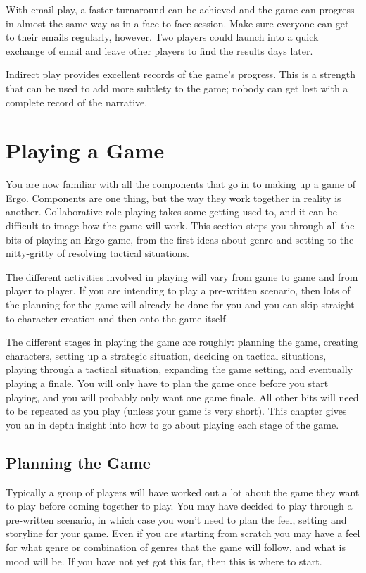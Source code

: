 \documentclass[twoside]{book}
\begin{document}
With email play, a faster turnaround can be achieved and the game can
progress in almost the same way as in a face-to-face session. Make
sure everyone can get to their emails regularly, however. Two players
could launch into a quick exchange of email and leave other players to
find the results days later.

Indirect play provides excellent records of the game's progress. This
is a strength that can be used to add more subtlety to the game;
nobody can get lost with a complete record of the narrative.

\chapter{Playing a Game}

You are now familiar with all the components that go in to making up a
game of Ergo. Components are one thing, but the way they work together
in reality is another. Collaborative role-playing takes some getting
used to, and it can be difficult to image how the game will work. This
section steps you through all the bits of playing an Ergo game, from
the first ideas about genre and setting to the nitty-gritty of
resolving tactical situations.

The different activities involved in playing will vary from game to
game and from player to player. If you are intending to play a
pre-written scenario, then lots of the planning for the game will
already be done for you and you can skip straight to character
creation and then onto the game itself.

The different stages in playing the game are roughly: planning the
game, creating characters, setting up a strategic situation, deciding
on tactical situations, playing through a tactical situation,
expanding the game setting, and eventually playing a finale. You will
only have to plan the game once before you start playing, and you will
probably only want one game finale. All other bits will need to be
repeated as you play (unless your game is very short). This chapter
gives you an in depth insight into how to go about playing each stage
of the game.

\section{Planning the Game}

Typically a group of players will have worked out a lot about the game
they want to play before coming together to play. You may have decided
to play through a pre-written scenario, in which case you won't need
to plan the feel, setting and storyline for your game. Even if you are
starting from scratch you may have a feel for what genre or
combination of genres that the game will follow, and what is mood will
be. If you have not yet got this far, then this is where to start.
\end{document}
